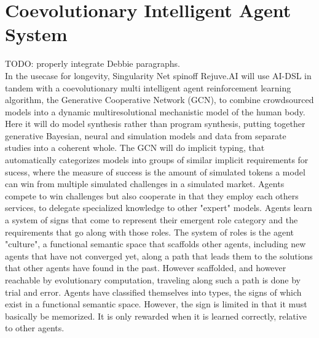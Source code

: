 \documentclass[]{report}
\begin{document}
\section{Coevolutionary Intelligent Agent System}
TODO: properly integrate Debbie paragraphs.\\

In the usecase for longevity, Singularity Net spinoff Rejuve.AI will
use AI-DSL in tandem with a coevolutionary multi intelligent agent
reinforcement learning algorithm, the Generative Cooperative Network
(GCN), to combine crowdsourced models into a dynamic multiresolutional
mechanistic model of the human body.   Here it will do model synthesis
rather than program synthesis, putting together generative Bayesian,
neural and simulation models and data from separate studies into a
coherent whole.  The GCN will do implicit typing, that automatically
categorizes models into groups of similar implicit requirements for
sucess, where the measure of success is the amount of simulated tokens
a model can win from multiple simulated challenges in a simulated
market. Agents compete to win challenges but also cooperate in that
they employ each others services, to delegate specialized knowledge to
other "expert" models. Agents learn a system of signs that come to
represent their emergent role category and the  requirements that go
along with those roles.  The system of roles is the agent "culture",
a functional semantic space that scaffolds other agents, including new
agents that have not converged yet, along a path that leads them to
the solutions that other agents have found in the past. However
scaffolded, and however reachable by evolutionary computation,
traveling along such a path is done by trial and error. Agents have
classified themselves into types, the signs of which exist in a
functional semantic space. However, the sign is limited in that it
must basically be memorized. It is only rewarded when it is learned
correctly, relative to other agents.
\end{document}
